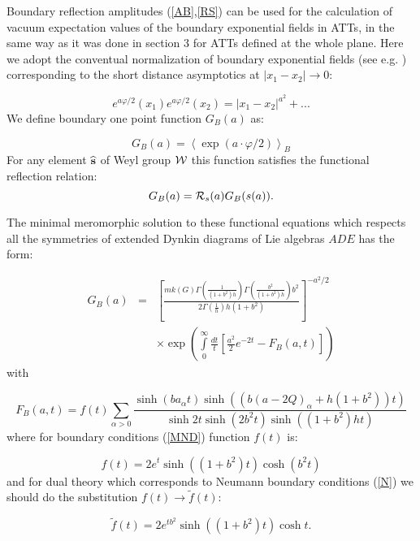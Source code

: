 \documentclass[a4paper,12pt]{article}
\begin{document}
Boundary reflection amplitudes (\ref{AB},\ref{RS}) can be used for the
calculation of vacuum expectation values of the boundary exponential fields
in ATTs, in the same way as it was done in section 3 
for ATTs defined at the whole
plane. Here we adopt the conventual normalization of boundary exponential
fields (see e.g. \cite{FLZ}) corresponding to the short distance asymptotics
at $\left| x_1-x_2\right| \rightarrow 0$:

\[
e^{a\varphi /2}(x_1)e^{a\varphi /2}(x_2)=\left| x_1-x_2\right| ^{a^2}+... 
\]
We define boundary one point function $G_B(a)$ as:

\begin{equation}
G_B(a)=\left\langle \exp (a\cdot \varphi /2)\right\rangle _B  \label{OP}
\end{equation}
For any element $\widehat{{\bf s}}$ of Weyl group ${\cal W}$ this function
satisfies the functional reflection relation: 
\begin{equation}
G_B(a)={\cal R}_s(a)G_B(s(a)).  \label{FE}
\end{equation}

The minimal meromorphic solution to these functional equations which 
respects all
the symmetries of extended Dynkin diagrams of Lie algebras $ADE$ has the
form:

\begin{eqnarray}
G_B(a)&=&
\left[ \frac{mk(G)\Gamma \left( \frac 1{(1+b^2)h}\right) \Gamma
\left( \frac{b^2}{(1+b^2)h}\right) b^2}{2\Gamma \left( \frac 1h\right)
h(1+b^2)}\right] ^{-a^2/2}
\nonumber \\
&& \times
\exp \left( \int\limits_0^\infty \frac{dt}t[\frac{a^2}2
e^{-2t}-F_B(a,t)]\right)  \label{vevs}
\end{eqnarray}
with

\begin{equation}
F_B(a,t)=f(t)\sum_{\alpha >0}\frac{\sinh (ba_\alpha t)\sinh ((b(a-2Q)_\alpha
+h(1+b^2))t)}{\sinh 2t\sinh (2b^2t)\sinh ((1+b^2)ht)}  \label{fbs}
\end{equation}
where for boundary conditions (\ref{MND}) function $f(t)$ is:

\begin{equation}
f(t)=2e^t\sinh ((1+b^2)t)\cosh (b^2t)  \label{fB}
\end{equation}
and for dual theory which corresponds to Neumann boundary conditions (\ref{N})
we should do the substitution $f(t)\rightarrow \widetilde{f}(t)$:

\begin{equation}
\widetilde{f}(t)=2e^{tb^2}\sinh ((1+b^2)t)\cosh t.  \label{fN}
\end{equation}
\end{document}
